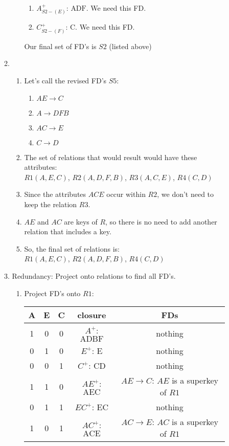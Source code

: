 \documentclass{csc_assignment2}
\begin{document}
\begin{description}
\begin{enumerate}
\begin{enumerate}
\begin{enumerate}
\begin{enumerate}
\item $A^{+}_{S2 - (E)}$: $\text{ADF}$. We need this FD.
\item $C^{+}_{S2 - (F)}$: $\text{C}$. We need this FD.
\end{enumerate}
Our final set of FD's is $S2$ (listed above)
\end{enumerate}
\newpage
\item \begin{enumerate} \item Let's call the revised FD's  $S5$: \begin{enumerate}
\item $AE \rightarrow C$ 
\item $A \rightarrow DFB$ 
\item $AC \rightarrow E$ 
\item $C \rightarrow D$
\end{enumerate}
\item The set of relations that would result would have these attributes: \\
{$R1(A, E, C)$, $R2(A, D, F, B)$, $R3(A, C, E)$, $R4(C, D)$}
\item Since the attributes $ACE$ occur within $R2$, we don't need to keep the relation $R3$. 
\item $AE$ and $AC$ are keys of $R$, so there is no need to add another relation that includes a key.
\item So, the final set of relations is: \\
{$R1(A, E, C)$, $R2(A, D, F, B)$, $R4(C, D)$}
\end{enumerate}
\item Redundancy: Project onto relations to find all FD's. \begin{enumerate}
\item Project FD's onto $R1$:\\
\begin{tabular}{ |c|c|c|c|c| } 
 \hline
 A & E & C & closure & FDs \\
 \hline
 1 & 0 & 0 & $A^{+}$: $\text{ADBF}$ & nothing \\ 
 \hline
 0 & 1 & 0 & $E^{+}$: $\text{E}$ & nothing \\ 
 \hline
 0 & 0 & 1 & $C^{+}$: $\text{CD}$ & nothing \\
 \hline
 1 & 1 & 0 & $AE^{+}$: $\text{AEC}$ & $AE \rightarrow C$: $AE$ is a superkey of $R1$ \\
 \hline
 0 & 1 & 1 & $EC^{+}$: $\text{EC}$ & nothing \\
 \hline
 1 & 0 & 1 & $AC^{+}$: $\text{ACE}$ & $AC \rightarrow E$: $AC$ is a superkey of $R1$ \\

\end{tabular}
\end{enumerate}
\end{enumerate}
\end{enumerate}
\end{description}
\end{document}
